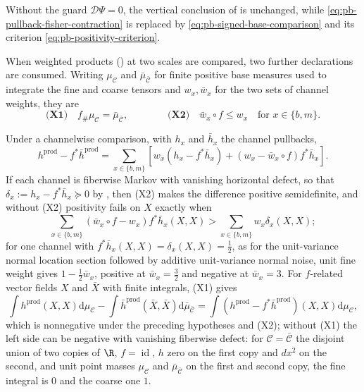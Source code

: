 Without the guard \(\mathcal D\Psi=0\), the vertical conclusion of
 is unchanged, while
\eqref{eq:pb-pullback-fisher-contraction} is replaced by \eqref{eq:pb-signed-base-comparison} and its
criterion \eqref{eq:pb-positivity-criterion}.

When weighted products () at two scales are compared, two
further declarations are consumed. Writing \(\mu_{\mathcal C}\) and \(\bar\mu_{\bar{\mathcal C}}\)
for finite positive base measures used to integrate the fine and coarse tensors and \(w_x,\bar w_x\)
for the two sets of channel weights, they are
\begin{equation}
\textbf{(X1)}\quad f_\#\mu_{\mathcal C}=\bar\mu_{\bar{\mathcal C}},
\qquad\qquad
\textbf{(X2)}\quad \bar w_x\circ f\leq w_x
\quad\text{for }x\in\{b,m\}.
\label{eq:pb-cross-scale-declarations}
\end{equation}

Under a channelwise comparison, with \(h_x\) and \(\bar h_x\) the channel pullbacks,
\begin{equation}
h^{\mathrm{prod}}-f^*\bar h^{\mathrm{prod}}
=\sum_{x\in\{b,m\}}
\left[
w_x\left(h_x-f^*\bar h_x\right)
+\left(w_x-\bar w_x\circ f\right)f^*\bar h_x
\right].
\label{eq:pb-two-channel-comparison}
\end{equation}
If each channel is fiberwise Markov with vanishing horizontal defect, so that
\(\delta_x:=h_x-f^*\bar h_x\succeq0\) by , then (X2) makes the
difference positive semidefinite, and without (X2) positivity fails on \(X\) exactly when
\begin{equation}
\sum_{x\in\{b,m\}}(\bar w_x\circ f-w_x)f^*\bar h_x(X,X)
>\sum_{x\in\{b,m\}}w_x\delta_x(X,X);
\label{eq:pb-weight-positivity-failure}
\end{equation}
for one channel with \(f^*\bar h_x(X,X)=\delta_x(X,X)=\tfrac12\), as for the unit-variance normal
location section followed by additive unit-variance normal noise, unit fine weight gives
\(1-\tfrac12\bar w_x\), positive at \(\bar w_x=\tfrac32\) and negative at \(\bar w_x=3\). For
\(f\)-related vector fields \(X\) and \(\bar X\) with finite integrals, (X1) gives
\[
\int h^{\mathrm{prod}}(X,X)\mathrm d\mu_{\mathcal C}-\int\bar h^{\mathrm{prod}}(\bar X,\bar X)\mathrm d\bar\mu_{\bar{\mathcal C}}
=\int(h^{\mathrm{prod}}-f^*\bar h^{\mathrm{prod}})(X,X)\mathrm d\mu_{\mathcal C},
\]
which is nonnegative under the preceding hypotheses and (X2); without (X1) the left side can be
negative with vanishing fiberwise defect: for \(\mathcal C=\bar{\mathcal C}\) the disjoint union of two
copies of \(\R\), \(f=\operatorname{id}\), \(h\) zero on the first copy and \(dx^2\) on the second, and
unit point masses \(\mu_{\mathcal C}\) and \(\bar\mu_{\bar{\mathcal C}}\) on the first and second copy,
the fine integral is \(0\) and the coarse one \(1\). 

